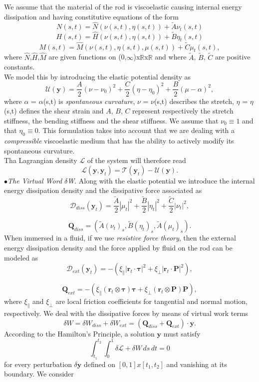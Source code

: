 \documentclass[12pt]{article}
\newcommand{\cB}{B}
\newcommand{\cA}{A}
\newcommand{\cC}{C}
\begin{document}
We assume that the material of the rod is viscoelastic causing internal energy dissipation and having constitutive equations of the form
\[  N (s,t)=  \hat{N}(\nu (s,t),\eta (s,t)) + \tilde{A} \nu_t (s,t)
\]
\[  H (s,t)=  \hat{H}(\nu (s,t),\eta (s,t)) + \tilde{B} \eta_t (s,t)
\]
\[  M (s,t)=  \hat{M}(\nu (s,t),\eta (s,t), \mu(s,t)) + \tilde{C} \mu_t (s,t),
\]
where $\hat{N}$,$\hat{H}$,$\hat{M}$ are given functions on (0,$\infty$)x$\mathbb{R}$x$\mathbb{R}$ and where $\tilde{A}$, $\tilde{B}$, $\tilde{C}$ are positive constants.
\\
We model this by introducing the elastic potential density  as
\[ \mathcal{U}(\mathbf{y}) = \frac{\cA}{2} (\nu - \nu_0)^2
+ \frac{\cC}{2} (\eta - \eta_0 )^2
+ \frac{\cB}{2} (\mu -\alpha)^2,
\]
where $\alpha$ = $\alpha$(s,t) is \emph{spontaneous curvature}, $\nu$ = $\nu$(s,t) describes the stretch, $\eta$ = $\eta$(s,t) defines the shear strain and $\cA$, $\cB$, $\cC$ represent respectively the stretch stiffness, the bending stiffness and the shear stiffness. We assume that $\nu_0\equiv1$ and that $\eta_0\equiv0$.
This formulation takes into account that we are dealing with a \emph{compressible} viscoelastic medium that has the ability to actively modify its spontaneous curvature.\\
Tha Lagrangian density $\mathcal{L}$ of the system will therefore read
\[ \mathcal{L}(\mathbf{y},\mathbf{y}_t)= \mathcal{T}(\mathbf{y}_t) - \mathcal{U}(\mathbf{y}).
\]
$\bullet$\emph{The Virtual Word $\delta$W}. Along with the elastic potential we introduce the internal energy dissipation density  and the dissipative force associated as 
\[ \mathcal{D}_{diss}(\mathbf{y}_t) = \frac{\tilde{A}}{2}\left|\mu_t\right|^2 + \frac{\tilde{B}}{2}\left|\eta_t\right|^2
+ \frac{\tilde{C}}{2}\left|\nu_t\right|^2,
\]

\[
\mathbf{Q}_{diss}= (\tilde{A}(\nu_t)_s,\tilde{B}(\eta_t)_s,\tilde{A}(\mu_t)_s).
\]
When immersed in a fluid, if we use \emph{resistive force theory},
then the external energy dissipation density and the force applied by fluid on the rod can be modeled as
\[ \mathcal{D}_{ext}(\mathbf{y}_t)= -(\xi_\parallel\left|\mathbf{r}_t\cdot\mathbf{\tau}\right|^2 + \xi_\perp \left|\mathbf{r}_t\cdot\mathbf{P}\right|^2),
\]

\[\mathbf{Q}_{ext} = -( \xi_\parallel (\mathbf{r}_t\otimes\mathbf{\tau})\mathbf{\tau} + \xi_\perp (\mathbf{r}_t\otimes\mathbf{P})\mathbf{P}),
\]
where $\xi_\parallel$ and $\xi_\perp$ are local friction coefficients for tangential and normal motion, respectively.
We deal with the dissipative forces by means of virtual work terms
\[\delta W = \delta W_{diss} + \delta W_{ext} = (\mathbf{Q}_{diss}+\mathbf{Q}_{ext})\cdot\mathbf{y}.
\]
According to the Hamilton's Principle, a solution $\mathbf{y}$ must satisfy
\[\int_{t_1}^{t_2} \int_{0}^{1} \delta \mathcal{L}+\delta W\, ds \, dt = 0
\]
for every perturbation $\delta \mathbf{y}$ defined on $[0,1]x[t_1,t_2]$ and vanishing at its boundary. We consider 
\end{document}
